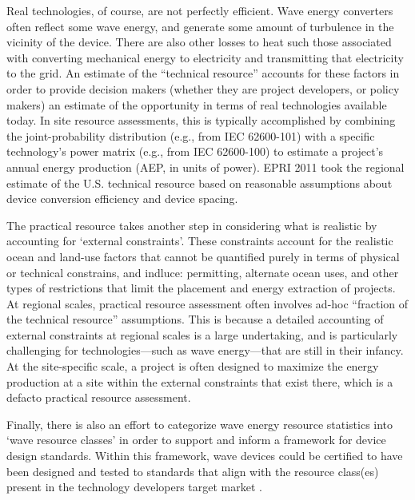 Real technologies, of course, are not perfectly efficient. Wave energy converters often reflect some wave energy, and generate some amount of turbulence in the vicinity of the device. There are also other losses to heat such those associated with converting mechanical energy to electricity and transmitting that electricity to the grid. An estimate of the ``technical resource'' accounts for these factors in order to provide decision makers (whether they are project developers, or policy makers) an estimate of the opportunity in terms of real technologies available today. In site resource assessments, this is typically accomplished by combining the joint-probability distribution (e.g., from IEC 62600-101) with a specific technology's power matrix (e.g., from IEC 62600-100) to estimate a project's annual energy production (AEP, in units of power). EPRI 2011 took the regional estimate of the U.S. technical resource based on reasonable assumptions about device conversion efficiency and device spacing.

The practical resource takes another step in considering what is realistic by accounting for `external constraints'. These constraints account for the realistic ocean and land-use factors that cannot be quantified purely in terms of physical or technical constrains, and indluce: permitting, alternate ocean uses, and other types of restrictions that limit the placement and energy extraction of projects. At regional scales, practical resource assessment often involves ad-hoc ``fraction of the technical resource'' assumptions. This is because a detailed accounting of external constraints at regional scales is a large undertaking, and is particularly challenging for technologies—such as wave energy—that are still in their infancy. At the site-specific scale, a project is often designed to maximize the energy production at a site within the external constraints that exist there, which is a defacto practical resource assessment.

Finally, there is also an effort to categorize wave energy resource statistics into `wave resource classes' in order to support and inform a framework for device design standards. Within this framework, wave devices could be certified to have been designed and tested to standards that align with the resource class(es) present in the technology developers target market \citep[][]{ahnGlobalWaveEnergy2022,nearyClassificationSystemsWave2018}.
